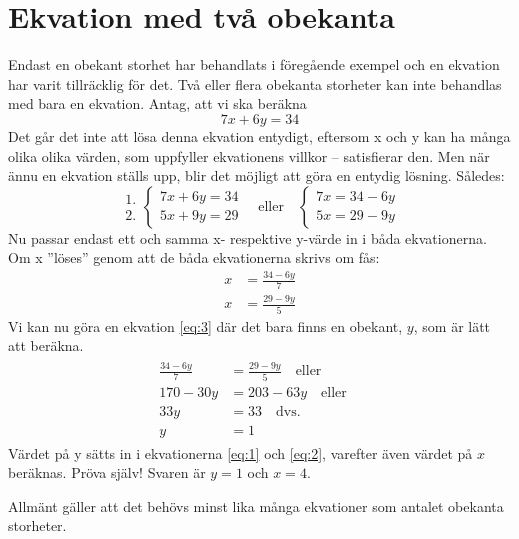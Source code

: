 \section{Ekvation med två obekanta}

Endast en obekant storhet har behandlats i föregående exempel och en ekvation
har varit tillräcklig för det.
Två eller flera obekanta storheter kan inte behandlas med bara en ekvation.
Antag, att vi ska beräkna
\[7x+6y=34\]
Det går det inte att lösa denna ekvation entydigt, eftersom x och y kan ha många
olika olika värden, som uppfyller ekvationens villkor -- satisfierar den.
Men när ännu en ekvation ställs upp, blir det möjligt att göra en entydig
lösning.
Således:
\[
\begin{array}{c}
1.\\2.
\end{array}
\left\{
\begin{array}{l}
7x + 6y = 34\\
5x + 9y = 29
\end{array}
\right.
\quad \text{eller} \quad
\left\{
\begin{array}{l}
7x = 34 - 6y\\
5x = 29 - 9y 
\end{array}
\right. 
\]
Nu passar endast ett och samma x- respektive y-värde in i båda ekvationerna.
Om x ''löses'' genom att de båda ekvationerna skrivs om fås:
\begin{align}
  \label{eq:1}
  x &= \frac{34-6y}{7}\\
  \label{eq:2}
  x &= \frac{29-9y}{5}
\end{align}
Vi kan nu göra en ekvation \ref{eq:3} där det bara finns en obekant, \(y\),
som är lätt att beräkna.
\begin{align}
  \begin{split}
    \label{eq:3}
    \frac{34 - 6y}{7} &= \frac{29 - 9y}{5}
    \quad \text{eller} \\
    170 - 30y &= 203-63y
    \quad \text{eller} \quad \\
    33y &= 33
    \quad \text{dvs.} \quad \\
    y &= 1
  \end{split}
\end{align}
Värdet på y sätts in i ekvationerna \ref{eq:1} och \ref{eq:2}, varefter även
värdet på \(x\) beräknas.
Pröva själv! Svaren är \(y = 1\) och \(x = 4\).

Allmänt gäller att det behövs minst lika många ekvationer som antalet obekanta
storheter.

